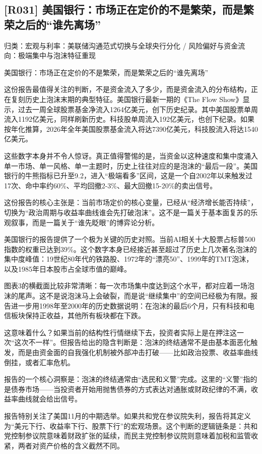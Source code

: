 \documentclass[11pt]{ctexart}
\begin{document}
\subsection{[R031] 美国银行：市场正在定价的不是繁荣，而是繁荣之后的“谁先离场”}
{\small\color{refgray}归类：宏观与利率：美联储沟通范式切换与全球央行分化 / 风险偏好与资金流向：极端集中与泡沫特征重现}

美国银行：市场正在定价的不是繁荣，而是繁荣之后的“谁先离场”

这份报告最值得关注的判断，不是资金流入了多少，而是资金流入的分布结构，正在复刻历史上泡沫末期的典型特征。美国银行最新一期的《The Flow Show》显示，过去一周全球股票基金净流入1264亿美元，创下历史纪录。其中美国股票单周流入1192亿美元，同样刷新历史。科技股单周流入192亿美元，也创下纪录。如果按年化推算，2026年全年美国股票基金流入将达7390亿美元，科技股流入将达1540亿美元。

这些数字本身并不令人惊讶。真正值得警惕的是，当资金以这种速度和集中度涌入单一市场、单一风格、单一主题时，历史上往往对应的是泡沫的“最后一段”。美国银行的牛熊指标已升至9.2，进入“极端看多”区间，这是一个自2002年以来触发过17次、命中率约60\%、平均回撤2-3\%、最大回撤15-20\%的卖出信号。

这份报告的核心主张是：当前市场定价的核心变量，已经从“经济增长能否持续”，切换为“政治周期与收益率曲线谁会先打破泡沫”。这不是一篇关于基本面复苏的乐观叙事，而是一篇关于“谁先眨眼”的博弈论分析。

美国银行的报告提供了一个极为关键的历史对照。当前AI相关十大股票占标普500指数的权重已达到39\%。这个数字本身已经接近甚至超过了历史上几次著名泡沫的集中度峰值：19世纪80年代的铁路股、1972年的“漂亮50”、1999年的TMT泡沫，以及1985年日本股市占全球市值的巅峰。

图表3的横截面比较非常清晰：每一次市场集中度达到这个水平，都对应着一场泡沫的尾声。这不是说泡沫马上会破裂，而是说“继续集中”的空间已经极为有限。报告进一步用1998年至2000年的历史数据说明：在泡沫的最后6个月，只有科技和电信板块保持正收益，其他所有板块都在下跌。

这意味着什么？如果当前的结构性行情继续下去，投资者实际上是在押注这一次“这次不一样”。但报告给出的隐含判断是：泡沫的终结通常不是由基本面恶化触发，而是由资金面的自我强化机制被外部冲击打破——比如政治投票、收益率曲线倒挂，或者汇率危机。

报告的一个核心洞察是：泡沫的终结通常由“选民和义警”完成。这里的“义警”指的是债券市场——当投资者开始用抛售债券的方式表达对通胀或财政纪律的不满，收益率曲线就会给出信号。

报告特别关注了美国11月的中期选举。如果共和党在参议院失利，报告将其定义为“美元下行、收益率下行、股票下行”的宏观场景。这个判断的逻辑链条是：共和党控制参议院意味着财政扩张的延续，而民主党控制参议院则意味着加税和监管收紧，两者对资产价格的含义截然不同。
\end{document}
